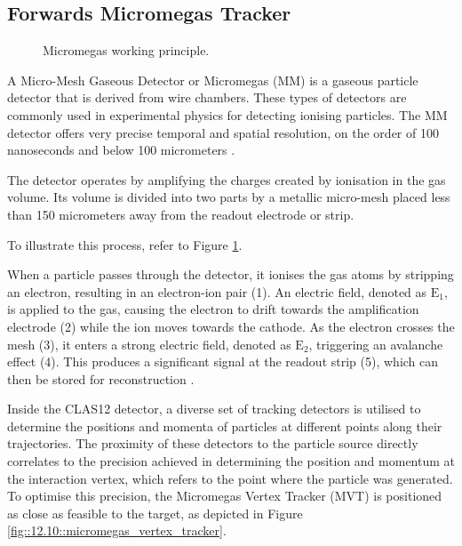 \subsection{Forwards Micromegas Tracker}
\label{12.10::forwards_micromegas_tracker}
    \begin{figure}[b!]
        \caption[Micromegas working principle.]
        {Micromegas working principle.}
        \label{fig::12.10::micromegas_principle}
    \end{figure}

    A Micro-Mesh Gaseous Detector or Micromegas (MM) is a gaseous particle detector that is derived from wire chambers.
    These types of detectors are commonly used in experimental physics for detecting ionising particles.
    The MM detector offers very precise temporal and spatial resolution, on the order of 100 nanoseconds and below 100 micrometers \cite{giomataris1996}.

    The detector operates by amplifying the charges created by ionisation in the gas volume.
    Its volume is divided into two parts by a metallic micro-mesh placed less than 150 micrometers away from the readout electrode or strip.

    To illustrate this process, refer to Figure \ref{fig::12.10::micromegas_principle}.

    When a particle passes through the detector, it ionises the gas atoms by stripping an electron, resulting in an electron-ion pair (1).
    An electric field, denoted as $\text{E}_1$, is applied to the gas, causing the electron to drift towards the amplification electrode (2) while the ion moves towards the cathode.
    As the electron crosses the mesh (3), it enters a strong electric field, denoted as $\text{E}_2$, triggering an avalanche effect (4).
    This produces a significant signal at the readout strip (5), which can then be stored for reconstruction \cite{giomataris1996}.

    Inside the CLAS12 detector, a diverse set of tracking detectors is utilised to determine the positions and momenta of particles at different points along their trajectories.
    The proximity of these detectors to the particle source directly correlates to the precision achieved in determining the position and momentum at the interaction vertex, which refers to the point where the particle was generated.
    To optimise this precision, the Micromegas Vertex Tracker (MVT) is positioned as close as feasible to the target, as depicted in Figure \ref{fig::12.10::micromegas_vertex_tracker}.

